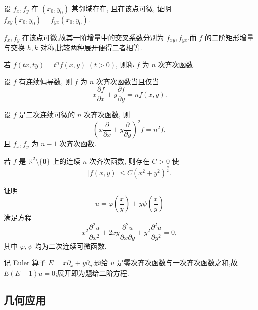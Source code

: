 \begin{example}
    设 $f_x,f_y$ 在 $(x_0,y_0)$ 某邻域存在, 且在该点可微, 证明 $f_{xy}(x_0,y_0)=f_{yx}(x_0,y_0)$.
\end{example}
\exampleblank

\begin{solution}
    $f_x,f_y$ 在该点可微,故其一阶增量中的交叉系数分别为 $f_{xy},f_{yx}$.而 $f$ 的二阶矩形增量与交换 $h,k$ 对称,比较两种展开便得二者相等.
\end{solution}

\begin{definition}
    若 $f(tx,ty)=t^nf(x,y)$ $(t>0)$, 则称 $f$ 为 $n$ 次齐次函数.
\end{definition}

\begin{proposition}[\markstar]
    设 $f$ 有连续偏导数, 则 $f$ 为 $n$ 次齐次函数当且仅当
    \[
        x\dfrac{\partial f}{\partial x}+y\dfrac{\partial f}{\partial y}=nf(x,y).
    \]
\end{proposition}

\begin{proposition}[\markstar]
    设 $f$ 是二次连续可微的 $n$ 次齐次函数, 则
    \[
        \left(x\dfrac{\partial}{\partial x}+y\dfrac{\partial}{\partial y}\right)^2f=n^2f,
    \]
    且 $f_x,f_y$ 为 $n-1$ 次齐次函数.
\end{proposition}

\begin{proposition}
    若 $f$ 是 $\mathbb{R}^2\setminus\{\bm{0}\}$ 上的连续 $n$ 次齐次函数, 则存在 $C>0$ 使
    \[
        |f(x,y)|\leq C(x^2+y^2)^{\frac{n}{2}}.
    \]
\end{proposition}

\begin{example}
    证明
    \[
        u=\varphi\left(\dfrac{x}{y}\right)+y\psi\left(\dfrac{x}{y}\right)
    \]
    满足方程
    \[
        x^2\dfrac{\partial^2u}{\partial x^2}
        +2xy\dfrac{\partial^2u}{\partial x\partial y}
        +y^2\dfrac{\partial^2u}{\partial y^2}=0,
    \]
    其中 $\varphi,\psi$ 均为二次连续可微函数.
\end{example}
\exampleblank

\begin{solution}
    记 Euler 算子 $E=x\partial_x+y\partial_y$.题给 $u$ 是零次齐次函数与一次齐次函数之和,故 $E(E-1)u=0$;展开即为题给二阶方程.
\end{solution}



\subsection{几何应用}

